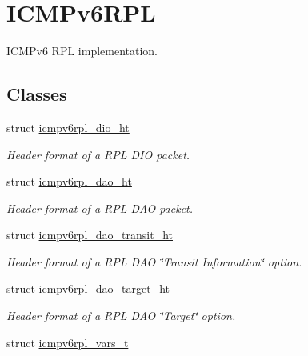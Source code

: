 \hypertarget{group___i_c_m_pv6_r_p_l}{}\section{I\+C\+M\+Pv6\+R\+PL}
\label{group___i_c_m_pv6_r_p_l}


I\+C\+M\+Pv6 R\+PL implementation.  


\subsection*{Classes}
\begin{DoxyCompactItemize}
\item 
struct \hyperlink{structicmpv6rpl__dio__ht}{icmpv6rpl\+\_\+dio\+\_\+ht}
\begin{DoxyCompactList}\small\item\em Header format of a R\+PL D\+IO packet. \end{DoxyCompactList}\item 
struct \hyperlink{structicmpv6rpl__dao__ht}{icmpv6rpl\+\_\+dao\+\_\+ht}
\begin{DoxyCompactList}\small\item\em Header format of a R\+PL D\+AO packet. \end{DoxyCompactList}\item 
struct \hyperlink{structicmpv6rpl__dao__transit__ht}{icmpv6rpl\+\_\+dao\+\_\+transit\+\_\+ht}
\begin{DoxyCompactList}\small\item\em Header format of a R\+PL D\+AO \char`\"{}\+Transit Information\char`\"{} option. \end{DoxyCompactList}\item 
struct \hyperlink{structicmpv6rpl__dao__target__ht}{icmpv6rpl\+\_\+dao\+\_\+target\+\_\+ht}
\begin{DoxyCompactList}\small\item\em Header format of a R\+PL D\+AO \char`\"{}\+Target\char`\"{} option. \end{DoxyCompactList}\item 
struct \hyperlink{structicmpv6rpl__vars__t}{icmpv6rpl\+\_\+vars\+\_\+t}
\end{DoxyCompactItemize}
